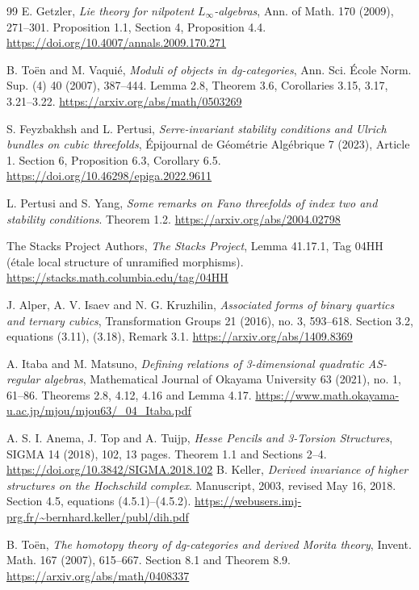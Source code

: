 \documentclass[a4paper,11pt]{ltjsarticle}
\theoremstyle{definition}
\begin{document}
\begin{thebibliography}{99}
E. Getzler,
\emph{Lie theory for nilpotent $L_\infty$-algebras},
Ann. of Math. 170 (2009), 271--301.
Proposition 1.1, Section 4, Proposition 4.4.
\url{https://doi.org/10.4007/annals.2009.170.271}

B. To\"en and M. Vaqui\'e,
\emph{Moduli of objects in dg-categories},
Ann. Sci. \'Ecole Norm. Sup. (4) 40 (2007), 387--444.
Lemma 2.8, Theorem 3.6, Corollaries 3.15, 3.17, 3.21--3.22.
\url{https://arxiv.org/abs/math/0503269}

S. Feyzbakhsh and L. Pertusi,
\emph{Serre-invariant stability conditions and Ulrich bundles on cubic threefolds},
\'Epijournal de G\'eom\'etrie Alg\'ebrique 7 (2023), Article 1.
Section 6, Proposition 6.3, Corollary 6.5.
\url{https://doi.org/10.46298/epiga.2022.9611}

L. Pertusi and S. Yang,
\emph{Some remarks on Fano threefolds of index two and stability conditions}.
Theorem 1.2.
\url{https://arxiv.org/abs/2004.02798}

The Stacks Project Authors,
\emph{The Stacks Project},
Lemma 41.17.1, Tag 04HH (\'etale local structure of unramified morphisms).
\url{https://stacks.math.columbia.edu/tag/04HH}

J. Alper, A. V. Isaev and N. G. Kruzhilin,
\emph{Associated forms of binary quartics and ternary cubics},
Transformation Groups 21 (2016), no. 3, 593--618.
Section 3.2, equations (3.11), (3.18), Remark 3.1.
\url{https://arxiv.org/abs/1409.8369}

A. Itaba and M. Matsuno,
\emph{Defining relations of 3-dimensional quadratic AS-regular algebras},
Mathematical Journal of Okayama University 63 (2021), no. 1, 61--86.
Theorems 2.8, 4.12, 4.16 and Lemma 4.17.
\url{https://www.math.okayama-u.ac.jp/mjou/mjou63/_04_Itaba.pdf}

A. S. I. Anema, J. Top and A. Tuijp,
\emph{Hesse Pencils and 3-Torsion Structures},
SIGMA 14 (2018), 102, 13 pages.
Theorem 1.1 and Sections 2--4.
\url{https://doi.org/10.3842/SIGMA.2018.102}
B. Keller,
\emph{Derived invariance of higher structures on the Hochschild complex}.
Manuscript, 2003, revised May 16, 2018.
Section 4.5, equations (4.5.1)--(4.5.2).
\url{https://webusers.imj-prg.fr/~bernhard.keller/publ/dih.pdf}

B. To\"en,
\emph{The homotopy theory of dg-categories and derived Morita theory},
Invent. Math. 167 (2007), 615--667.
Section 8.1 and Theorem 8.9.
\url{https://arxiv.org/abs/math/0408337}


\end{thebibliography}
\end{document}
